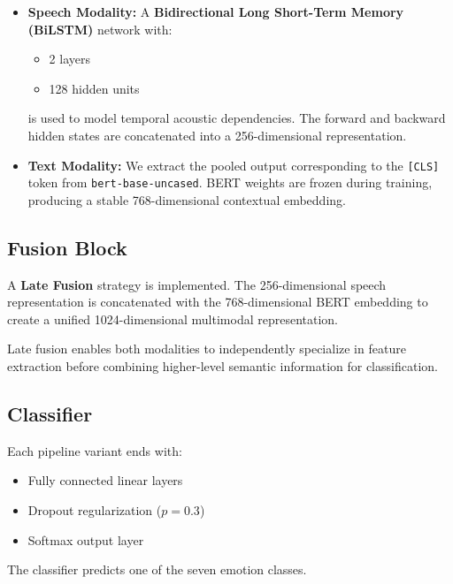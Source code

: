 \documentclass[11pt,journal,onecolumn]{IEEEtran}
\begin{document}
\begin{itemize}
    \item \textbf{Speech Modality:}
    A \textbf{Bidirectional Long Short-Term Memory (BiLSTM)} network with:
    \begin{itemize}
        \item 2 layers
        \item 128 hidden units
    \end{itemize}
    
    is used to model temporal acoustic dependencies. The forward and backward hidden states are concatenated into a 256-dimensional representation.

    \item \textbf{Text Modality:}
    We extract the pooled output corresponding to the \texttt{[CLS]} token from \texttt{bert-base-uncased}. BERT weights are frozen during training, producing a stable 768-dimensional contextual embedding.
\end{itemize}

\subsection{Fusion Block}

A \textbf{Late Fusion} strategy is implemented. The 256-dimensional speech representation is concatenated with the 768-dimensional BERT embedding to create a unified 1024-dimensional multimodal representation.

Late fusion enables both modalities to independently specialize in feature extraction before combining higher-level semantic information for classification.

\subsection{Classifier}

Each pipeline variant ends with:
\begin{itemize}
    \item Fully connected linear layers
    \item Dropout regularization ($p = 0.3$)
    \item Softmax output layer
\end{itemize}

The classifier predicts one of the seven emotion classes.
\newpage
\end{document}
